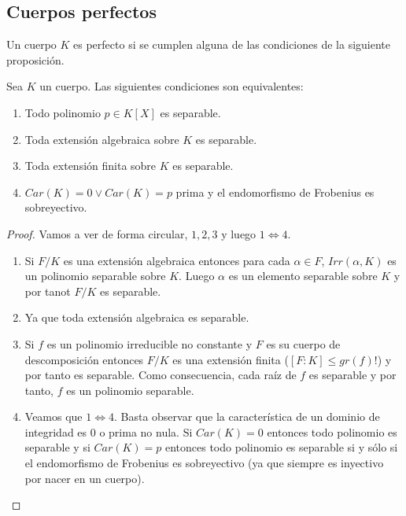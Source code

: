 \subsection{Cuerpos perfectos}

\begin{definition}
Un cuerpo $K$ es perfecto si se cumplen alguna de las condiciones de la siguiente proposición. 
\end{definition}

\begin{proposition}
Sea $K$ un cuerpo. Las siguientes condiciones son equivalentes:

\begin{enumerate}
\item Todo polinomio $p \in K[X]$ es separable.
\item Toda extensión algebraica sobre $K$  es separable.
\item Toda extensión finita sobre $K$ es separable.
\item $Car(K) = 0 \lor Car(K) = p$ prima y el endomorfismo de Frobenius es sobreyectivo. 
\end{enumerate}
\end{proposition}
\begin{proof}
Vamos a ver de forma circular, $1,2,3$ y luego $1 \iff 4$.
\begin{enumerate}
\item Si $F/K$ es una extensión algebraica entonces para cada $\alpha \in F$, $Irr(\alpha,K)$ es un polinomio separable sobre $K$. Luego $\alpha$ es un elemento separable sobre $K$ y por tanot $F/K$ es separable.
\item Ya que toda extensión algebraica es separable. 
\item Si $f$ es un polinomio irreducible no constante y $F$ es su cuerpo de descomposición entonces $F/K$ es una extensión finita ($[F:K] \le gr(f)!$) y por tanto es separable. Como consecuencia, cada raíz de $f$ es separable y por tanto, $f$ es un polinomio separable. 

\item Veamos que $1 \iff 4$. Basta observar que la característica de un dominio de integridad es 0 o prima no nula. Si $Car(K) = 0$ entonces todo polinomio es separable y si $Car(K) = p$ entonces todo polinomio es separable si y sólo si el endomorfismo de Frobenius es sobreyectivo (ya que siempre es inyectivo por nacer en un cuerpo). 
\end{enumerate}
\end{proof}

